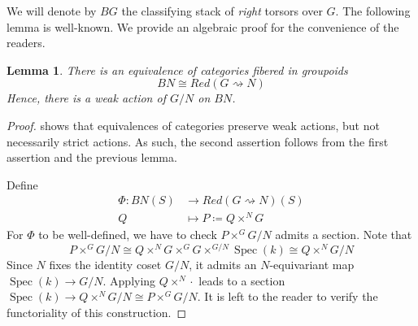 \documentclass[12pt, final]{amsart}
\theoremstyle{remark}
\theoremstyle{definition}
\theoremstyle{plain}
\newtheorem{lemma}[example]{Lemma}
\newcommand{\rsa}{\rightsquigarrow}
\DeclareMathOperator{\Spec}{Spec}
\begin{document}
We will denote by $BG$ the classifying stack of \textit{right} torsors over $G$. 
The following lemma is well-known. We provide an algebraic proof for the convenience of the readers.

\begin{lemma}\label{l:reduction}
    There is an equivalence of categories fibered in groupoids
    $$ BN \cong Red(G\rsa N) $$
    Hence, there is a weak action of $G/N$ on $BN$. 
\end{lemma}

\begin{proof}
     shows that equivalences of categories preserve weak actions,
    but not necessarily strict actions. As such, the second assertion follows from the 
    first assertion and the previous lemma. 


Define 
        \begin{align*}
            \Phi \colon BN(S) &\to Red(G\rsa N)(S) \\
            Q &\mapsto P \coloneqq Q \times^{N} G
        \end{align*} For $\Phi$ to be well-defined, we have to check $P \times^G G/N$ admits a section. Note that
        \[
            P \times^G G/N  \cong Q \times^{N} G \times^G G\times^{G/N} \Spec(k) \cong Q \times^{N} G/N
        \] Since $N$ fixes the identity coset $G/N$, it admits an $N$-equivariant map $\Spec(k) \to G/N$. Applying $Q\times^{N} \cdot$ leads to a section $\Spec(k) \to Q \times^{N} G/N \cong  P \times^G G/N$. It is left to the reader to verify the functoriality of this construction.




\end{proof}
\end{document}
